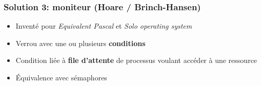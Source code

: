 \documentclass{beamer}
\begin{document}
\begin{frame}
  \frametitle{Solution 3: \textbf{moniteur} (Hoare / Brinch-Hansen)}
  \begin{minipage}{.49\textwidth}
    \begin{itemize}
    \item Inventé pour \textit{Equivalent Pascal} et \textit{Solo operating
        system}
    \item Verrou avec une ou plusieurs \textbf{conditions}
    \item Condition liée à \textbf{file d'attente} de processus voulant
      accéder à une ressource
    \item Équivalence avec sémaphores
    \end{itemize}
  \end{minipage}
  \begin{minipage}{.49\textwidth}
    \begin{center}
    \end{center}
  \end{minipage}
\end{frame} %
\end{document}
